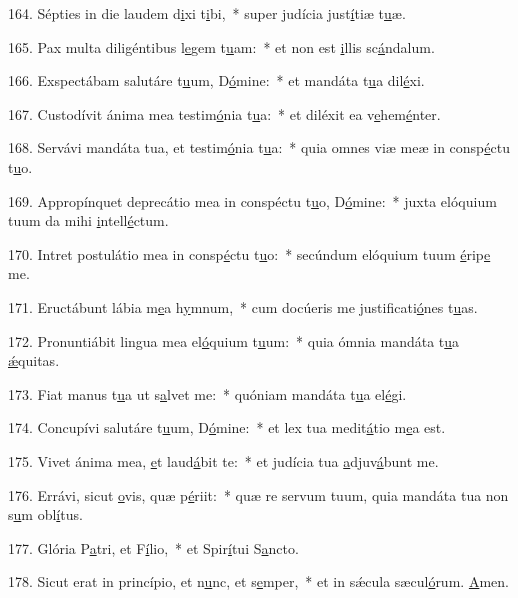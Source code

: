 164. Sépties in die laudem d\uline{i}xi t\uline{i}bi,~* super judícia just\uline{í}tiæ t\uline{u}æ.\par 
165. Pax multa diligéntibus l\uline{e}gem t\uline{u}am:~* et non est \uline{i}llis sc\uline{á}ndalum.\par 
166. Exspectábam salutáre t\uline{u}um, D\uline{ó}mine:~* et mandáta t\uline{u}a dil\uline{é}xi.\par 
167. Custodívit ánima mea testim\uline{ó}nia t\uline{u}a:~* et diléxit ea v\uline{e}hem\uline{é}nter.\par 
168. Servávi mandáta tua, et testim\uline{ó}nia t\uline{u}a:~* quia omnes viæ meæ in consp\uline{é}ctu t\uline{u}o.\par 
169. Appropínquet deprecátio mea in conspéctu t\uline{u}o, D\uline{ó}mine:~* juxta elóquium tuum da mihi \uline{i}ntell\uline{é}ctum.\par 
170. Intret postulátio mea in consp\uline{é}ctu t\uline{u}o:~* secúndum elóquium tuum \uline{é}rip\uline{e} me.\par 
171. Eructábunt lábia m\uline{e}a h\uline{y}mnum,~* cum docúeris me justificati\uline{ó}nes t\uline{u}as.\par 
172. Pronuntiábit lingua mea el\uline{ó}quium t\uline{u}um:~* quia ómnia mandáta t\uline{u}a \uline{ǽ}quitas.\par 
173. Fiat manus t\uline{u}a ut s\uline{a}lvet me:~* quóniam mandáta t\uline{u}a el\uline{é}gi.\par 
174. Concupívi salutáre t\uline{u}um, D\uline{ó}mine:~* et lex tua medit\uline{á}tio m\uline{e}a est.\par 
175. Vivet ánima mea, \uline{e}t laud\uline{á}bit te:~* et judícia tua \uline{a}djuv\uline{á}bunt me.\par 
176. Errávi, sicut \uline{o}vis, quæ p\uline{é}riit:~* quæ re servum tuum, quia mandáta tua non s\uline{u}m obl\uline{í}tus.\par 
177. Glória P\uline{a}tri, et F\uline{í}lio,~* et Spir\uline{í}tui S\uline{a}ncto.\par 
178. Sicut erat in princípio, et n\uline{u}nc, et s\uline{e}mper,~* et in sǽcula sæcul\uline{ó}rum. \uline{A}men.\par 
